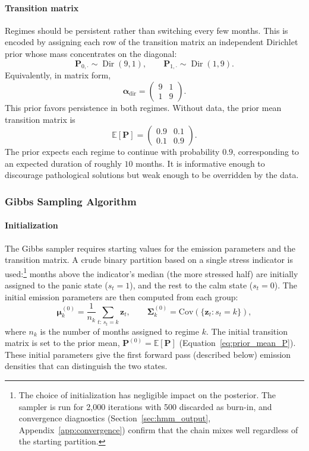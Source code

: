\paragraph{Transition matrix}
Regimes should be persistent rather than switching every few months. This is encoded by assigning each row of the transition matrix an independent Dirichlet prior whose mass concentrates on the diagonal:
\begin{equation}
\mathbf{P}_{0,\cdot} \sim \operatorname{Dir}(9,1),
\qquad
\mathbf{P}_{1,\cdot} \sim \operatorname{Dir}(1,9).
\label{eq:dirichlet_prior}
\end{equation}
Equivalently, in matrix form,
\[
\boldsymbol{\alpha}_{\text{dir}}
=
\left(\begin{array}{cc}
9 & 1 \\
1 & 9
\end{array}\right).
\]
This prior favors persistence in both regimes. Without data, the prior mean transition matrix is
\begin{equation}
\mathbb{E}[\mathbf{P}] =
\left(\begin{array}{cc}
0.9 & 0.1 \\
0.1 & 0.9
\end{array}\right).
\label{eq:prior_mean_P}
\end{equation}
The prior expects each regime to continue with probability $0.9$, corresponding to an expected duration of roughly $10$ months. It is informative enough to discourage pathological solutions but weak enough to be overridden by the data.

\subsubsection{Gibbs Sampling Algorithm}\label{sec:gibbs_sampler}

\paragraph{Initialization}
The Gibbs sampler requires starting values for the emission parameters and the transition matrix. A crude binary partition based on a single stress indicator is used:\footnote{The choice of initialization has negligible impact on the posterior. The sampler is run for 2{,}000 iterations with 500 discarded as burn-in, and convergence diagnostics (Section~\ref{sec:hmm_output}, Appendix~\ref{app:convergence}) confirm that the chain mixes well regardless of the starting partition.} months above the indicator's median (the more stressed half) are initially assigned to the panic state ($s_t=1$), and the rest to the calm state ($s_t=0$). The initial emission parameters are then computed from each group:
\[
\boldsymbol{\mu}_k^{(0)} = \frac{1}{n_k}\sum_{t:\,s_t=k}\mathbf{z}_t,
\qquad
\boldsymbol{\Sigma}_k^{(0)} = \text{Cov}(\{\mathbf{z}_t : s_t=k\}),
\]
where $n_k$ is the number of months assigned to regime $k$. The initial transition matrix is set to the prior mean, $\mathbf{P}^{(0)} = \mathbb{E}[\mathbf{P}]$ (Equation~\ref{eq:prior_mean_P}). These initial parameters give the first forward pass (described below) emission densities that can distinguish the two states.

